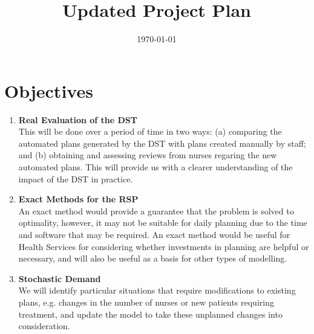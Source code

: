 \documentclass[a4paper]{article}
\begin{document}
\title{Updated Project Plan}
\date{\today}
\maketitle

\section*{Objectives}
\begin{enumerate}[leftmargin=*]
	\item \textbf{Real Evaluation of the DST}\\
	This will be done over a period of time in two ways: (a) comparing the automated plans generated by the DST with plans created manually by staff; and (b) obtaining and assessing reviews from nurses regaring the new automated plans. This will provide us with a clearer understanding of the impact of the DST in practice.
	\item \textbf{Exact Methods for the RSP}\\
	An exact method would provide a guarantee that the problem is solved to optimality, however, it may not be suitable for daily planning due to the time and software that may be required. An exact method would be useful for Health Services for considering whether investments in planning are helpful or necessary, and will also be useful as a basis for other types of modelling.
	\item \textbf{Stochastic Demand}\\
	We will identify particular situations that require modifications to existing plans, e.g. changes in the number of nurses or new patients requiring treatment, and update the model to take these unplanned changes into consideration.
\end{enumerate}	

\end{document}

